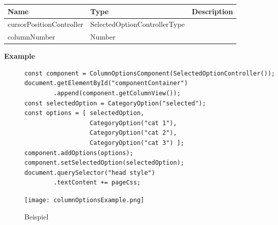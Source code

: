 \begin{table}[!htb] 
    \label{api:columnOptionsComponentParameter}
    \footnotesize
    \setlength\extrarowheight{4pt}
    \begin{tabular}{ p{3.2cm} p{4.2cm} p{5.6cm} }
        \toprule[1.2pt]
        \textbf{Name}            & \textbf{Type}                & \textbf{Description} \\
        \midrule
        cursorPositionController & SelectedOptionControllerType &  \\
        columnNumber             & Number                       &  \\
        \bottomrule[1.2pt]
    \end{tabular}
\end{table}

\vspace*{6pt}
\noindent
\textbf{Example}

\begin{figure}[!htb]
    \begin{minipage}[b]{0.75\textwidth}
        \begin{lstlisting}[style = htmlcssjs, label = api:columnOptionsComponentExample]
const component = ColumnOptionsComponent(SelectedOptionController());
document.getElementById("componentContainer")
        .append(component.getColumnView());
const selectedOption = CategoryOption("selected");
const options = [ selectedOption,
                  CategoryOption("cat 1"),
                  CategoryOption("cat 2"),
                  CategoryOption("cat 3") ];
component.addOptions(options);
component.setSelectedOption(selectedOption);
document.querySelector("head style")
        .textContent += pageCss;
        \end{lstlisting}
    \end{minipage}
    \hfill
    \begin{minipage}[b]{0.2\textwidth}
        \centering
        \texttt{[image: columnOptionsExample.png]}
        \caption*{\centering Beispiel }
        \label{api:columnOptionsComponentImg}
    \end{minipage}
\end{figure}
